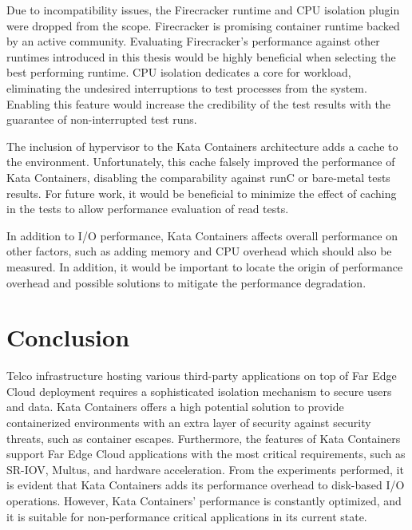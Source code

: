 Due to incompatibility issues, the Firecracker runtime and CPU isolation plugin were dropped from the scope. Firecracker is promising container runtime backed by an active community. Evaluating Firecracker's performance against other runtimes introduced in this thesis would be highly beneficial when selecting the best performing runtime. CPU isolation dedicates a core for workload, eliminating the undesired interruptions to test processes from the system. Enabling this feature would increase the credibility of the test results with the guarantee of non-interrupted test runs.

The inclusion of hypervisor to the Kata Containers architecture adds a cache to the environment. Unfortunately, this cache falsely improved the performance of Kata Containers, disabling the comparability against runC or bare-metal tests results. For future work, it would be beneficial to minimize the effect of caching in the tests to allow performance evaluation of read tests.

In addition to I/O performance, Kata Containers affects overall performance on other factors, such as adding memory and CPU overhead which should also be measured. In addition, it would be important to locate the origin of performance overhead and possible solutions to mitigate the performance degradation.

\section{Conclusion}

Telco infrastructure hosting various third-party applications on top of Far Edge Cloud deployment requires a sophisticated isolation mechanism to secure users and data. Kata Containers offers a high potential solution to provide containerized environments with an extra layer of security against security threats, such as container escapes. Furthermore, the features of Kata Containers support Far Edge Cloud applications with the most critical requirements, such as SR-IOV, Multus, and hardware acceleration. From the experiments performed, it is evident that Kata Containers adds its performance overhead to disk-based I/O operations. However, Kata Containers' performance is constantly optimized, and it is suitable for non-performance critical applications in its current state.